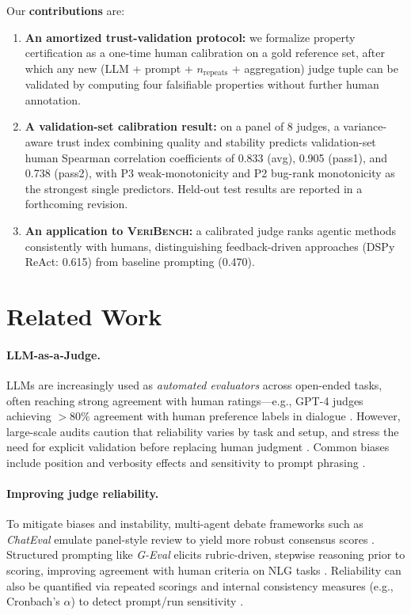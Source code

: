 \documentclass{article}
\begin{document}
Our \textbf{contributions} are:
\begin{enumerate}
  \item \textbf{An amortized trust-validation protocol:} we formalize property certification as a one-time human calibration on a gold reference set, after which any new (LLM + prompt + \(n_\text{repeats}\) + aggregation) judge tuple can be validated by computing four falsifiable properties without further human annotation.
  \item \textbf{A validation-set calibration result:} on a panel of 8 judges, a variance-aware trust index combining quality and stability predicts validation-set human Spearman correlation coefficients of 0.833 (avg), 0.905 (pass1), and 0.738 (pass2), with P3 weak-monotonicity and P2 bug-rank monotonicity as the strongest single predictors. Held-out test results are reported in a forthcoming revision.
  \item \textbf{An application to \textsc{VeriBench}:} a calibrated judge ranks agentic methods consistently with humans, distinguishing feedback-driven approaches (DSPy ReAct: 0.615) from baseline prompting (0.470).
\end{enumerate}

\section{Related Work}
\paragraph{LLM-as-a-Judge.}
LLMs are increasingly used as \emph{automated evaluators} across open-ended tasks, often reaching strong agreement with human ratings—e.g., GPT-4 judges achieving $>$80\% agreement with human preference labels in dialogue \citep{Zheng2023MTBench}. However, large-scale audits caution that reliability varies by task and setup, and stress the need for explicit validation before replacing human judgment \citep{Kocmi2024HumanVsLLM,Li2024TrustLLMJudgments}. Common biases include position and verbosity effects and sensitivity to prompt phrasing \citep{Zheng2023MTBench,Li2024TrustLLMJudgments}.

\paragraph{Improving judge reliability.}
To mitigate biases and instability, multi-agent debate frameworks such as \emph{ChatEval} emulate panel-style review to yield more robust consensus scores \citep{Chan2024ChatEval}. Structured prompting like \emph{G-Eval} elicits rubric-driven, stepwise reasoning prior to scoring, improving agreement with human criteria on NLG tasks \citep{Liu2023GEval}. Reliability can also be quantified via repeated scorings and internal consistency measures (e.g., Cronbach’s $\alpha$) to detect prompt/run sensitivity \citep{Li2024TrustLLMJudgments}.
\end{document}
